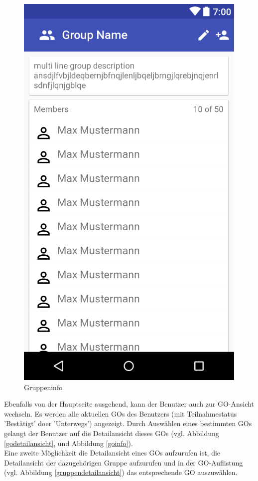 \documentclass[parskip=full]{scrartcl}
\begin{document}
\begin{figure}[H]
\begin{minipage}[b]{0.4\textwidth}
    \includegraphics[width=\textwidth]{GUI/AndroidStudio/group_info.PNG}
	\caption{Gruppeninfo}\label{gruppeninfo}
  \end{minipage}
  \vspace{1cm}
\end{figure}

Ebenfalls von der Hauptseite ausgehend, kann der Benutzer auch zur GO-Ansicht wechseln. Es werden alle aktuellen GOs des Benutzers (mit Teilnahmestatus 'Bestätigt' doer 'Unterwegs') angezeigt. Durch Auswählen eines bestimmten GOs gelangt der Benutzer auf die Detailansicht dieses GOs (vgl. Abbildung \ref{godetailansicht}, und Abbildung \ref{goinfo}).\\
Eine zweite Möglichkeit die Detailansicht eines GOs aufzurufen ist, die Detailansicht der dazugehörigen Gruppe aufzurufen und in der GO-Auflistung (vgl. Abbildung \ref{gruppendetailansicht}) das entsprechende GO auszuwählen. \\
\end{document}
